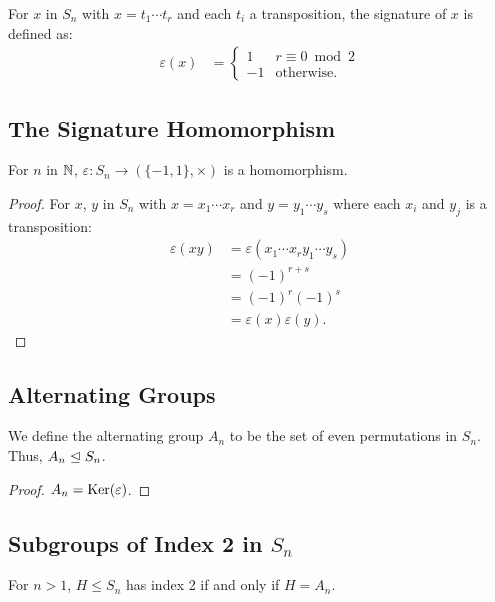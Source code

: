For $x$ in $S_n$ with $x = t_1 \cdots t_r$ and each $t_i$ a transposition,
the signature of $x$ is defined as: \begin{align*}
    \varepsilon(x) &= \begin{cases}
        1 & r \equiv 0 \bmod 2 \\
        -1 & \text{otherwise}.
    \end{cases}
\end{align*}

\subsection{The Signature Homomorphism}

For $n$ in $\mathbb{N}$, $\varepsilon : S_n \to (\{-1, 1\}, \times)$ is a
homomorphism.

\begin{proof}
    For $x$, $y$ in $S_n$ with $x = x_1 \cdots x_r$ and $y = y_1 \cdots y_s$
    where each $x_i$ and $y_j$ is a transposition: \begin{align*}
        \varepsilon(xy) 
        &= \varepsilon(x_1 \cdots x_ry_1 \cdots y_s) \\
        &= (-1)^{r + s} \\
        &= (-1)^r(-1)^s \\
        &= \varepsilon(x)\varepsilon(y).
    \end{align*}
\end{proof}

\subsection{Alternating Groups}

We define the alternating group $A_n$ to be the set of even permutations
in $S_n$. Thus, $A_n \trianglelefteq S_n$.

\begin{proof}
    $A_n = \operatorname{Ker}(\varepsilon)$.
\end{proof}

\subsection{Subgroups of Index 2 in $S_n$}

For $n > 1$, $H \leq S_n$ has index 2 if and only if $H = A_n$.

